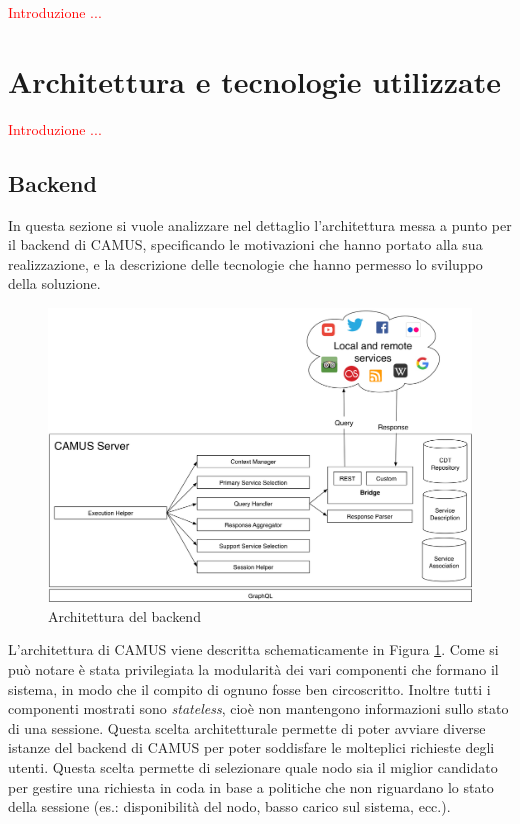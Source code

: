 \textcolor{red}{Introduzione ...}

\section{Architettura e tecnologie utilizzate}

\textcolor{red}{Introduzione ...}

\subsection{Backend\label{sec:architettura-backend}}

In questa sezione si vuole analizzare nel dettaglio l'architettura messa a punto per il backend di CAMUS, specificando le motivazioni che hanno portato alla sua realizzazione, e la descrizione delle tecnologie che hanno permesso lo sviluppo della soluzione.

\begin{figure}[ht]
	\centering
	\includegraphics[width=\textwidth]{4-progettazione-alto-livello/Immagini/camus-architecture-backend.png}
	\caption{Architettura del backend}\label{fig:architettura-backend}
\end{figure}

L'architettura di CAMUS viene descritta schematicamente in Figura \ref{fig:architettura-backend}. Come si può notare è stata privilegiata la modularità dei vari componenti che formano il sistema, in modo che il compito di ognuno fosse ben circoscritto. Inoltre tutti i componenti mostrati sono \emph{stateless}, cioè non mantengono informazioni sullo stato di una sessione. Questa scelta architetturale permette di poter avviare diverse istanze del backend di CAMUS per poter soddisfare le molteplici richieste degli utenti. Questa scelta permette di selezionare quale nodo sia il miglior candidato per gestire una richiesta in coda in base a politiche che non riguardano lo stato della sessione (es.: disponibilità del nodo, basso carico sul sistema, ecc.).

